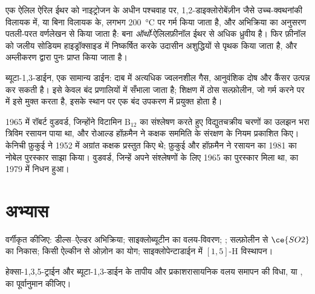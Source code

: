 \begin{inthelab}[एक क्लाइज़न पुनर्विन्यास]
एक ऐलिल ऐरिल ईथर को नाइट्रोजन के अधीन पश्चवाह पर, 1,2-डाइक्लोरोबेंज़ीन जैसे
उच्च-क्वथनांकी विलायक में, या बिना विलायक के, लगभग \qty{200}{\celsius} पर गर्म किया जाता है, और
अभिक्रिया का अनुसरण पतली-परत वर्णलेखन से किया जाता है: बना \textit{ऑर्थो}-ऐलिलफ़ीनॉल
ईथर से अधिक ध्रुवीय है। फिर फ़ीनॉल को जलीय सोडियम
हाइड्रॉक्साइड में निष्कर्षित करके उदासीन अशुद्धियों से पृथक किया जाता है, और अम्लीकरण द्वारा पुनः प्राप्त किया जाता है।
\end{inthelab}

\begin{safety}{}
ब्यूटा-1,3-डाईन, एक सामान्य डाईन: दाब में अत्यधिक ज्वलनशील गैस, आनुवंशिक दोष और
कैंसर उत्पन्न कर सकती है। इसे केवल बंद प्रणालियों में सँभाला जाता है; शिक्षण में
ठोस सल्फ़ोलीन, जो गर्म करने पर  में इसे मुक्त करता है,
इसके स्थान पर एक बंद उपकरण में प्रयुक्त होता है।
\end{safety}

\begin{history}[कक्षक सममिति]
1965 में रॉबर्ट वुडवर्ड, जिन्होंने विटामिन B$_{12}$ का संश्लेषण करते हुए विद्युतचक्रीय चरणों का
उलझन भरा त्रिविम रसायन पाया था, और रोआल्ड हॉफ़मैन ने कक्षक सममिति के संरक्षण के
नियम प्रकाशित किए। केनिची फ़ुकुई ने 1952 में अग्रांत कक्षक
प्रस्तुत किए थे; फ़ुकुई और हॉफ़मैन ने रसायन का 1981 का नोबेल पुरस्कार
साझा किया। वुडवर्ड, जिन्हें अपने संश्लेषणों के लिए 1965 का पुरस्कार मिला था, का
1979 में निधन हुआ।
\end{history}

\section{अभ्यास}

\begin{exercise}[$\star$]\label{exo:b3:pericyclic:1}
वर्गीकृत कीजिए: डील्स--ऐल्डर अभिक्रिया; साइक्लोब्यूटीन का वलय-विवरण; ; सल्फ़ोलीन से $\ce{SO2}$ का निकास; किसी ऐल्कीन से ओज़ोन का योग;
साइक्लोपेन्टाडाईन में $[1,5]$-H विस्थापन।
\end{exercise}

\begin{exercise}[$\star$]\label{exo:b3:pericyclic:2}
हेक्सा-1,3,5-ट्राईन और ब्यूटा-1,3-डाईन के तापीय और
प्रकाशरासायनिक वलय समापन की विधा,  या , का पूर्वानुमान कीजिए।
\end{exercise}

